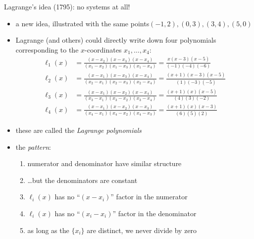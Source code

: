 \documentclass[10pt,hyperref]{beamer}
\begin{document}
\begin{frame}{Lagrange's idea (1795): no systems at all!}

\begin{itemize}
\item a new idea, illustrated with the same points\quad  $(-1,2), (0,3), (3,4), (5,0)$
\item Lagrange (and others) could directly write down four polynomials corresponding to the $x$-coordinates $x_1,\dots,x_4$:
\small
\begin{align*}
\ell_{1}(x) &= \frac{(x-x_2)(x-x_3)(x-x_4)}{(x_1-x_2)(x_1-x_3)(x_1-x_4)} = \frac{x (x-3) (x-5)}{(-1)(-4)(-6)} \\
\ell_{2}(x) &= \frac{(x-x_1)(x-x_3)(x-x_4)}{(x_2-x_1)(x_2-x_3)(x_2-x_4)} = \frac{(x+1) (x-3) (x-5)}{(1)(-3)(-5)} \\
\ell_{3}(x) &= \frac{(x-x_1)(x-x_2)(x-x_4)}{(x_3-x_1)(x_3-x_2)(x_3-x_4)} = \frac{(x+1) (x) (x-5)}{(4)(3)(-2)} \\
\ell_{4}(x) &= \frac{(x-x_1)(x-x_2)(x-x_3)}{(x_4-x_1)(x_4-x_2)(x_4-x_3)} = \frac{(x+1) (x) (x-3)}{(6)(5)(2)}
\end{align*}
\normalsize
\item these are called the \emph{Lagrange polynomials}
\item the \emph{pattern}:
  \begin{enumerate}
  \item numerator and denominator have similar structure
  \item \dots but the denominators are constant
  \item $\ell_i(x)$ has no ``$(x-x_i)$'' factor in the numerator
  \item $\ell_i(x)$ has no ``$(x_i-x_i)$'' factor in the denominator
  \item as long as the $\{x_i\}$ are distinct, we never divide by zero
  \end{enumerate}
\end{itemize}
\end{frame}
\end{document}
